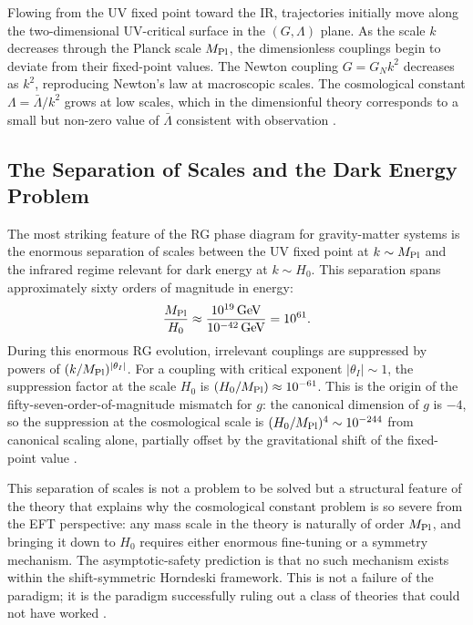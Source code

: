 \documentclass[12pt,a4paper]{article}
\begin{document}
Flowing from the UV fixed point toward the IR, trajectories initially move along
the two-dimensional UV-critical surface in the $(G, \Lambda)$ plane. As the scale
$k$ decreases through the Planck scale $M_{\rm Pl}$, the dimensionless couplings
begin to deviate from their fixed-point values. The Newton coupling $G = G_N k^2$
decreases as $k^2$, reproducing Newton's law at macroscopic scales. The
cosmological constant $\Lambda = \bar\Lambda/k^2$ grows at low scales, which in
the dimensionful theory corresponds to a small but non-zero value of $\bar\Lambda$
consistent with observation \cite{Bonanno2002,Planck2018}.

\subsection{The Separation of Scales and the Dark Energy Problem}

The most striking feature of the RG phase diagram for gravity-matter systems
is the enormous separation of scales between the UV fixed point at $k \sim M_{\rm Pl}$
and the infrared regime relevant for dark energy at $k \sim H_0$. This separation
spans approximately sixty orders of magnitude in energy:
\begin{equation}
\frac{M_{\rm Pl}}{H_0} \approx \frac{10^{19}\,\text{GeV}}{10^{-42}\,\text{GeV}}
= 10^{61}.
\end{equation}
During this enormous RG evolution, irrelevant couplings are suppressed by
powers of $(k/M_{\rm Pl})^{|\theta_I|}$. For a coupling with critical exponent
$|\theta_I| \sim 1$, the suppression factor at the scale $H_0$ is
$(H_0/M_{\rm Pl}) \approx 10^{-61}$. This is the origin of the fifty-seven-order-of-magnitude
mismatch for $g$: the canonical dimension of $g$ is $-4$, so the suppression
at the cosmological scale is $(H_0/M_{\rm Pl})^4 \sim 10^{-244}$ from canonical
scaling alone, partially offset by the gravitational shift of the fixed-point
value \cite{EichhornLinoWagner2023}.

This separation of scales is not a problem to be solved but a structural feature
of the theory that explains why the cosmological constant problem is so severe
from the EFT perspective: any mass scale in the theory is naturally of order
$M_{\rm Pl}$, and bringing it down to $H_0$ requires either enormous fine-tuning
or a symmetry mechanism. The asymptotic-safety prediction is that no such
mechanism exists within the shift-symmetric Horndeski framework. This is not
a failure of the paradigm; it is the paradigm successfully ruling out a class
of theories that could not have worked \cite{EichhornHebeckerPawlowskiWalcher2024,
BuoninfanteEtal2025}.
\end{document}
